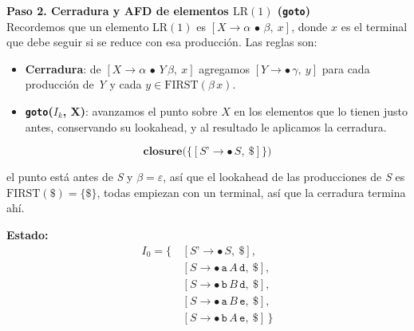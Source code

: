 \documentclass[12pt,letterpaper]{article}
\newcommand{\nt}[1]{\textit{#1}}
\newcommand{\tk}[1]{\texttt{#1}}
\newcommand{\First}[1]{\mathrm{FIRST}(#1)}
\newcommand{\lr}{\mathrm{LR(1)}}
\newcommand{\eps}{\varepsilon}
\begin{document}
\begin{enumerate}[label=\arabic*.]
  \textbf{Paso 2. Cerradura y AFD de elementos $\lr$ (\texttt{goto})}\\
  Recordemos que un elemento $\lr$ es $[\nt{X}\to\alpha\,\bullet\,\beta,\ x]$, donde $x$ es el terminal que debe
  seguir si se reduce con esa producción. Las reglas son:
  \begin{itemize}
  \item \textbf{Cerradura}: de $[\nt{X}\to\alpha\,\bullet\,\nt{Y}\,\beta,\ x]$ agregamos
    $[\nt{Y}\to\bullet\,\gamma,\ y]$ para cada producción de \nt{Y} y cada $y\in\First{\beta\,x}$.
  \item \textbf{\texttt{goto}($I_k$, X)}: avanzamos el punto sobre $X$ en los elementos que lo tienen justo
    antes, conservando su lookahead, y al resultado le aplicamos la cerradura.
  \end{itemize}

  \[
  \textbf{closure}\big(\{[\nt{S'}\to\bullet\,\nt{S},\ \tk{\$}]\}\big)
  \]
  
  el punto está antes de \nt{S} y $\beta = \eps$, así que el lookahead de las producciones de \nt{S} es\\
  $\First{\tk{\$}}=\{\tk{\$}\}$, todas empiezan con un terminal, así que la cerradura termina ahí.

  \bigskip

  \textbf{Estado:}
  \[
  \begin{aligned}
    I_0 = \{\, & [\nt{S'}\to\bullet\,\nt{S},\ \tk{\$}],\\
               & [\nt{S}\to\bullet\,\tk{a}\,\nt{A}\,\tk{d},\ \tk{\$}],\\
               & [\nt{S}\to\bullet\,\tk{b}\,\nt{B}\,\tk{d},\ \tk{\$}],\\
               & [\nt{S}\to\bullet\,\tk{a}\,\nt{B}\,\tk{e},\ \tk{\$}],\\
               & [\nt{S}\to\bullet\,\tk{b}\,\nt{A}\,\tk{e},\ \tk{\$}]\,\}
  \end{aligned}
  \]


\end{enumerate}
\end{document}
